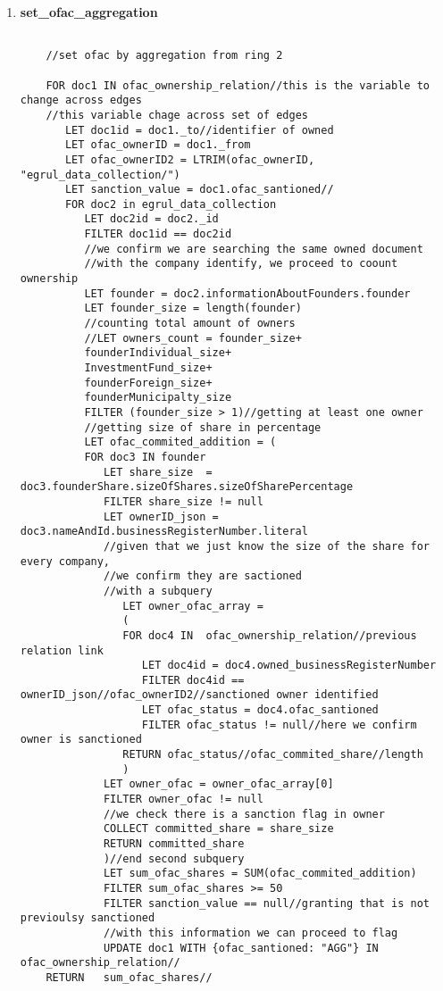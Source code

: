 \begin{enumerate}
    \item \textbf{set\_ofac\_aggregation}\label{query10}
    
	\begin{verbatim}
	
	//set ofac by aggregation from ring 2 
	
	FOR doc1 IN ofac_ownership_relation//this is the variable to change across edges
	//this variable chage across set of edges
	   LET doc1id = doc1._to//identifier of owned
	   LET ofac_ownerID = doc1._from
	   LET ofac_ownerID2 = LTRIM(ofac_ownerID, "egrul_data_collection/") 
	   LET sanction_value = doc1.ofac_santioned//	
	   FOR doc2 in egrul_data_collection
	      LET doc2id = doc2._id
	      FILTER doc1id == doc2id
	      //we confirm we are searching the same owned document
	      //with the company identify, we proceed to coount ownership
	      LET founder = doc2.informationAboutFounders.founder
	      LET founder_size = length(founder)
	      //counting total amount of owners
	      //LET owners_count = founder_size+
	      founderIndividual_size+
	      InvestmentFund_size+
	      founderForeign_size+
	      founderMunicipalty_size
	      FILTER (founder_size > 1)//getting at least one owner
	      //getting size of share in percentage
	      LET ofac_commited_addition = (
	      FOR doc3 IN founder
	         LET share_size  = doc3.founderShare.sizeOfShares.sizeOfSharePercentage
	         FILTER share_size != null
	         LET ownerID_json = doc3.nameAndId.businessRegisterNumber.literal
	         //given that we just know the size of the share for every company, 
	         //we confirm they are sactioned
	         //with a subquery
	            LET owner_ofac_array = 
	            (
	            FOR doc4 IN  ofac_ownership_relation//previous relation link
	               LET doc4id = doc4.owned_businessRegisterNumber
	               FILTER doc4id == ownerID_json//ofac_ownerID2//sanctioned owner identified
	               LET ofac_status = doc4.ofac_santioned
	               FILTER ofac_status != null//here we confirm owner is sanctioned
	            RETURN ofac_status//ofac_commited_share//length
	            )
	         LET owner_ofac = owner_ofac_array[0]
	         FILTER owner_ofac != null
	         //we check there is a sanction flag in owner
	         COLLECT committed_share = share_size
	         RETURN committed_share
	         )//end second subquery
	         LET sum_ofac_shares = SUM(ofac_commited_addition)
	         FILTER sum_ofac_shares >= 50
	         FILTER sanction_value == null//granting that is not previoulsy sanctioned      
	         //with this information we can proceed to flag 
	         UPDATE doc1 WITH {ofac_santioned: "AGG"} IN ofac_ownership_relation//
	RETURN   sum_ofac_shares//
	\end{verbatim}
	

\end{enumerate}
